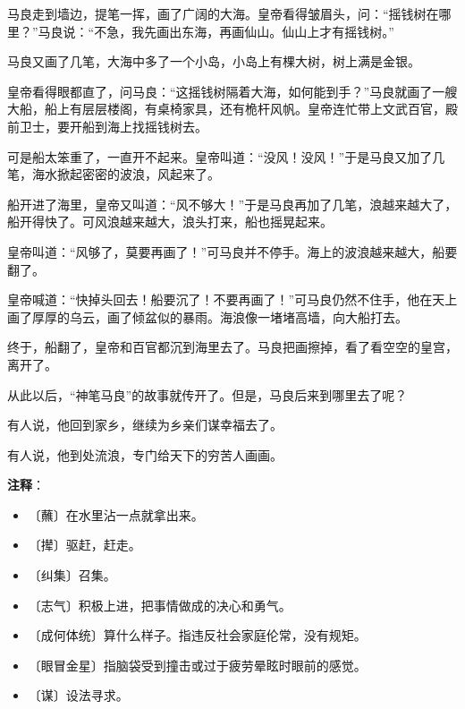 \documentclass[12pt,UTF-8,openany]{ctexbook}
\begin{document}
\begin{large}
    马良走到墙边，提笔一挥，画了广阔的大海。皇帝看得皱眉头，问：“摇钱树在哪里？”马良说：“不急，我先画出东海，再画仙山。仙山上才有摇钱树。”
    
    马良又画了几笔，大海中多了一个小岛，小岛上有棵大树，树上满是金银。
    
    皇帝看得眼都直了，问马良：“这摇钱树隔着大海，如何能到手？”马良就画了一艘大船，船上有层层楼阁，有桌椅家具，还有桅杆风帆。皇帝连忙带上文武百官，殿前卫士，要开船到海上找摇钱树去。
    
    可是船太笨重了，一直开不起来。皇帝叫道：“没风！没风！”于是马良又加了几笔，海水掀起密密的波浪，风起来了。
    
    船开进了海里，皇帝又叫道：“风不够大！”于是马良再加了几笔，浪越来越大了，船开得快了。可风浪越来越大，浪头打来，船也摇晃起来。
    
    皇帝叫道：“风够了，莫要再画了！”可马良并不停手。海上的波浪越来越大，船要翻了。
    
    皇帝喊道：“快掉头回去！船要沉了！不要再画了！”可马良仍然不住手，他在天上画了厚厚的乌云，画了倾盆似的暴雨。海浪像一堵堵高墙，向大船打去。
    
    终于，船翻了，皇帝和百官都沉到海里去了。马良把画擦掉，看了看空空的皇宫，离开了。
    
    从此以后，“神笔马良”的故事就传开了。但是，马良后来到哪里去了呢？
    
    有人说，他回到家乡，继续为乡亲们谋幸福去了。
    
    有人说，他到处流浪，专门给天下的穷苦人画画。
    
\end{large}


\newpage

\textbf{注释}：

\vspace{-1em}

\begin{itemize}
    \setlength\itemsep{-0.2em}
    \item 〔蘸〕在水里沾一点就拿出来。
    \item 〔撵〕驱赶，赶走。
    \item 〔纠集〕召集。
    \item 〔志气〕积极上进，把事情做成的决心和勇气。
    \item 〔成何体统〕算什么样子。指违反社会家庭伦常，没有规矩。
    \item 〔眼冒金星〕指脑袋受到撞击或过于疲劳晕眩时眼前的感觉。
    \item 〔谋〕设法寻求。
\end{itemize}
\end{document}
